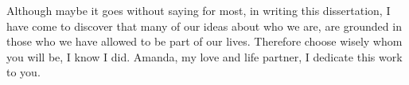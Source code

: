 \documentclass[phdthesis,12pt,final]{wuthesis}
\theoremstyle{definition}
\theoremstyle{definition}
\theoremstyle{definition}
\theoremstyle{definition}
\theoremstyle{remark}
\begin{document}









\begin{thesistitlepage}
\end{thesistitlepage}
\setcounter{page}{2}

\begin{thesiscopyrightpage}
\end{thesiscopyrightpage}

\cleardoublepage

\vspace*{\fill}

\noindent\thesiscommittee

\vspace*{10cm} %


\cleardoublepage
\begin{thesisdedicationpage}
Although maybe it goes without saying for most, in writing this dissertation, I have come to discover that many of our ideas about who we are, are grounded in those who we have allowed to be part of our lives. Therefore choose wisely whom you will be, I know I did. Amanda, my love and life partner, I dedicate this work to you.
\end{thesisdedicationpage}
\end{document}
